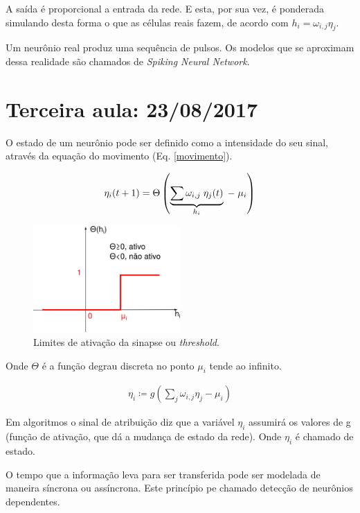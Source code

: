 A saída é proporcional a entrada da rede. E esta, por sua vez, é ponderada simulando desta forma o que as células reais fazem, de acordo com $h_{i}=\omega_{i,j}\eta_{j}$.

Um neurônio real produz uma sequência de pulsos. Os modelos que se aproximam dessa realidade são chamados de \textit{Spiking Neural Network}.


\section{Terceira aula: 23/08/2017}

O estado de um neurônio pode ser definido como a intensidade do seu sinal, através da equação do movimento (Eq. \ref{movimento}).

\begin{eqnarray}
\centering
\eta_{i}(t+1)= \Theta\left( \underbrace{\sum \omega_{i,j}\; \eta_{j}(t)}_{h_{i}}\;-\;\mu_{i}\right)
\label{movimento}
\end{eqnarray}


\begin{figure}[H]
\centering
\includegraphics[width=0.5\textwidth]{Imagens/Fig12.png}
\caption{Limites de ativação da sinapse ou \textit{threshold}.}
\label{Ativacao}
\end{figure}

Onde $\Theta$ é a função degrau discreta no ponto $\mu_{i}$ tende ao infinito. 

\begin{eqnarray}
\eta_{i}\coloneqq g\left(\sum_{j} \omega_{i,j} \eta_{j}-\mu_{i}\right)
\end{eqnarray}
	
Em algoritmos o sinal de atribuição diz que a variável $\eta_{i}$ assumirá os valores de g (função de ativação, que dá a mudança de estado da rede). Onde $\eta_{i}$ é chamado de estado.

O tempo que a informação leva para ser transferida pode ser modelada de maneira síncrona ou assíncrona. Este princípio pe chamado detecção de neurônios dependentes. 


